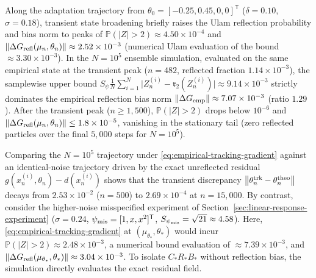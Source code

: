 \begin{enumerate}[label=(\alph*)]
   Along the adaptation trajectory from $\theta_0 = [-0.25, 0.45, 0, 0]^{\mathsf T}$ ($\delta=0.10$, $\sigma=0.18$), transient state broadening briefly raises the Ulam reflection probability and bias norm to peaks of $\mathbb{P}(\vert Z\vert > 2) \approx 4.50\times 10^{-4}$ and $\left\lVert \Delta G_{\rm refl}(\mu_n,\theta_n)\right\rVert \approx 2.52\times 10^{-3}$ (numerical Ulam evaluation of the bound $\approx 3.30\times 10^{-3}$). In the $N=10^5$ ensemble simulation, evaluated on the same empirical state at the transient peak ($n=482$, reflected fraction $1.14\times 10^{-3}$), the samplewise upper bound $S_\psi\frac{1}{N}\sum_{i=1}^N \vert Z_n^{(i)} - \mathfrak{r}_2(Z_n^{(i)})\vert \approx 9.14\times 10^{-3}$ strictly dominates the empirical reflection bias norm $\left\lVert \Delta G_{\rm emp}\right\rVert \approx 7.07\times 10^{-3}$ (ratio $1.29$). After the transient peak ($n \ge 1{,}500$), $\mathbb{P}(\vert Z\vert > 2)$ drops below $10^{-6}$ and $\left\lVert \Delta G_{\rm refl}(\mu_n,\theta_n)\right\rVert \le 1.8\times 10^{-5}$, vanishing in the stationary tail (zero reflected particles over the final $5{,}000$ steps for $N=10^5$). 
   
   Comparing the $N=10^5$ trajectory under \eqref{eq:empirical-tracking-gradient} against an identical-noise trajectory driven by the exact unreflected residual $g(x_n^{(i)},\theta_n)-d(x_n^{(i)})$ shows that the transient discrepancy $\left\lVert \theta_n^{\rm trk} - \theta_n^{\rm theo}\right\rVert$ decays from $2.53\times 10^{-2}$ ($n=500$) to $2.69\times 10^{-4}$ at $n=15{,}000$. By contrast, consider the higher-noise misspecified experiment of Section~\ref{sec:linear-response-experiment} ($\sigma=0.24$, $\psi_{\rm mis}=[1,x,x^2]^{\mathsf T}$, $S_{\psi_{\rm mis}}=\sqrt{21}\approx 4.58$). Here, \eqref{eq:empirical-tracking-gradient} at $(\mu_{\theta_*},\theta_*)$ would incur $\mathbb{P}(\vert Z\vert > 2) \approx 2.48\times 10^{-3}$, a numerical bound evaluation of $\approx 7.39\times 10^{-3}$, and $\left\lVert \Delta G_{\rm refl}(\mu_{\theta_*},\theta_*)\right\rVert \approx 3.04\times 10^{-3}$. To isolate $C_*R_*B_*$ without reflection bias, the simulation directly evaluates the exact residual field.
   

\end{enumerate}
